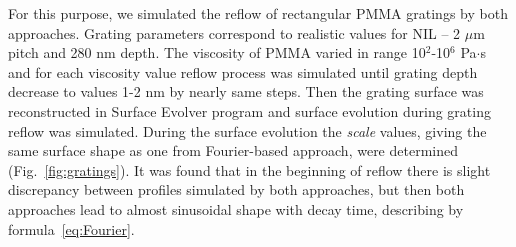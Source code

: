 \documentclass[12pt, letterpaper]{article}
\begin{document}
For this purpose, we simulated the reflow of rectangular PMMA gratings by both approaches. Grating parameters correspond to realistic values for NIL -- 2 $\mu$m pitch and 280 nm depth. The viscosity of PMMA varied in range 10$^2$-10$^6$ Pa$\cdot$s and for each viscosity value reflow process was simulated until grating depth decrease to values 1-2 nm by nearly same steps. Then the grating surface was reconstructed in Surface Evolver program and surface evolution during grating reflow was simulated. During the surface evolution the \textit{scale} values, giving the same surface shape as one from Fourier-based approach, were determined (Fig.~\ref{fig:gratings}). It was found that in the beginning of reflow there is slight discrepancy between profiles simulated by both approaches, but then both approaches lead to almost sinusoidal shape with decay time, describing by formula~\ref{eq:Fourier}.
\end{document}
